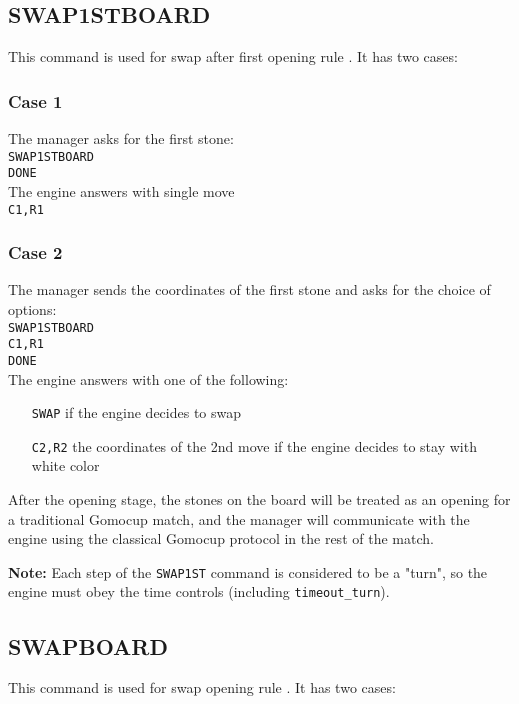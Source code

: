 \documentclass[12pt,a4paper]{article}
\begin{document}
\newpage
\subsection{SWAP1STBOARD}
\label{cmd_swap1st}
This command is used for swap after first opening rule \cite{renju_opening_rules}. It has two cases:

\subsubsection{Case 1}
The manager asks for the first stone:\\
\texttt{SWAP1STBOARD}\\
\texttt{DONE}\\
The engine answers with single move\\
\texttt{C1,R1}

\subsubsection{Case 2}
The manager sends the coordinates of the first stone and asks for the choice of options:\\
\texttt{SWAP1STBOARD}\\
\texttt{C1,R1}\\
\texttt{DONE}\\
The engine answers with one of the following:
\begin{enumerate}[leftmargin=7.5em]
\item[\texttt{SWAP}]{if the engine decides to swap}
\item[\texttt{C2,R2}]{the coordinates of the 2nd move if the engine decides to stay with white color}
\end{enumerate}

After the opening stage, the stones on the board will be treated as an opening for a traditional Gomocup match, and the manager will communicate with the engine using the classical Gomocup protocol in the rest of the match.

\textbf{Note:} Each step of the \texttt{SWAP1ST} command is considered to be a "turn", so the engine must obey the time controls (including \texttt{timeout{\_}turn}).


\subsection{SWAPBOARD}
\label{cmd_swap}
This command is used for swap opening rule \cite{gomoku_opening_rules}. It has two cases:
\end{document}
